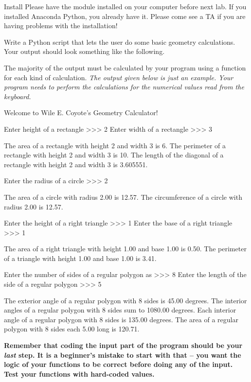 \documentclass[11pt]{cselabheader}
\begin{document}
{\begin{warningbox}{Install}
  Please have the  module installed on your computer
  before next lab. If you installed Anaconda Python, you already have it. Please
  come see a TA if you are having problems with the installation!
\end{warningbox}


\begin{ex}[geometry.py] Write a Python script that lets the user do some basic
  geometry calculations. Your output should look something like the following.

  The majority of the output must be calculated by your program using a function
  for each kind of calculation. \emph{The output given below is just an example.
  Your program needs to perform the calculations for the numerical values read
  from the keyboard.}

  \begin{verbatimcode}
Welcome to Wile E. Coyote's Geometry Calculator!

Enter height of a rectangle >>> 2
Enter width of a rectangle >>> 3

The area of a rectangle with height 2 and width 3 is 6.
The perimeter of a rectangle with height 2 and width 3 is 10.
The length of the diagonal of a rectangle with height 2 and width 3 is 3.605551.

Enter the radius of a circle >>> 2

The area of a circle with radius 2.00 is 12.57.
The circumference of a circle with radius 2.00 is 12.57.

Enter the height of a right triangle >>> 1
Enter the base of a right triangle >>> 1

The area of a right triangle with height 1.00 and base 1.00 is 0.50.
The perimeter of a triangle with height 1.00 and base 1.00 is 3.41.

Enter the number of sides of a regular polygon as >>> 8
Enter the length of the side of a regular polygon >>> 5

The exterior angle of a regular polygon with 8 sides is 45.00 degrees.
The interior angles of a regular polygon with 8 sides sum to 1080.00 degrees.
Each interior angle of a regular polygon with 8 sides is 135.00 degrees.
The area of a regular polygon with 8 sides each 5.00 long is 120.71.
  \end{verbatimcode}

  \begin{center}
    \bfseries Remember that coding the input part of the program should be your
    \emph{last} step. It is a beginner's mistake to start with that -- you want
    the logic of your functions to be correct before doing any of the input.
    Test your functions with hard-coded values.
  \end{center}


\end{ex}}
\end{document}
